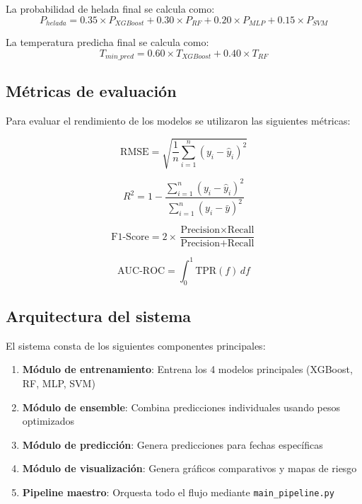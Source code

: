 \documentclass[11pt, a4paper]{article}
\begin{document}
La probabilidad de helada final se calcula como:
\begin{equation}
P_{helada} = 0.35 \times P_{XGBoost} + 0.30 \times P_{RF} + 0.20 \times P_{MLP} + 0.15 \times P_{SVM}
\end{equation}

La temperatura predicha final se calcula como:
\begin{equation}
T_{min\_pred} = 0.60 \times T_{XGBoost} + 0.40 \times T_{RF}
\end{equation}

\subsection{Métricas de evaluación}

Para evaluar el rendimiento de los modelos se utilizaron las siguientes métricas:

\begin{equation}
\text{RMSE} = \sqrt{\frac{1}{n}\sum_{i=1}^{n}(y_i - \hat{y}_i)^2}
\end{equation}

\begin{equation}
R^2 = 1 - \frac{\sum_{i=1}^{n}(y_i - \hat{y}_i)^2}{\sum_{i=1}^{n}(y_i - \bar{y})^2}
\end{equation}

\begin{equation}
\text{F1-Score} = 2 \times \frac{\text{Precision} \times \text{Recall}}{\text{Precision} + \text{Recall}}
\end{equation}

\begin{equation}
\text{AUC-ROC} = \int_{0}^{1} \text{TPR}(f) \, df
\end{equation}

\subsection{Arquitectura del sistema}

El sistema consta de los siguientes componentes principales:

\begin{enumerate}
    \item \textbf{Módulo de entrenamiento}: Entrena los 4 modelos principales (XGBoost, RF, MLP, SVM)
    \item \textbf{Módulo de ensemble}: Combina predicciones individuales usando pesos optimizados
    \item \textbf{Módulo de predicción}: Genera predicciones para fechas específicas
    \item \textbf{Módulo de visualización}: Genera gráficos comparativos y mapas de riesgo
    \item \textbf{Pipeline maestro}: Orquesta todo el flujo mediante \texttt{main\_pipeline.py}
\end{enumerate}
\end{document}
